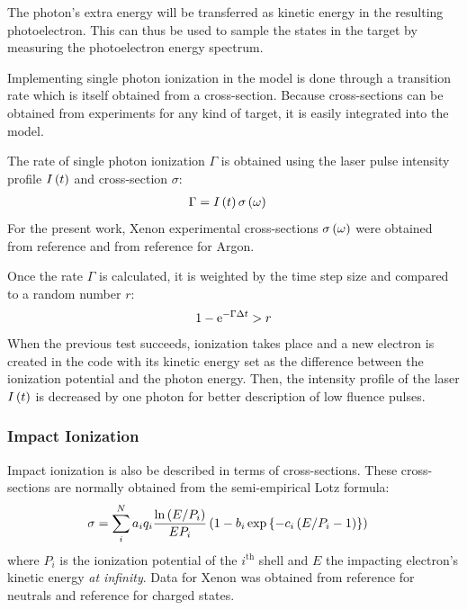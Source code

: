 The photon's extra energy will be transferred as kinetic energy in the
resulting photoelectron. This can thus be used to sample the states in the
target by measuring the photoelectron energy spectrum\cite{Fennel2010}.

Implementing single photon ionization in the model is done through a
transition rate which is itself obtained from a cross-section. Because
cross-sections can be obtained from experiments for any kind of target, it is
easily integrated into the model.

The rate of single photon ionization $\Gamma$ is obtained using the laser
pulse intensity profile $I\left( t \right)$ and cross-section $\sigma$:
\begin{align}
\Gamma & = I\left( t \right) \sigma\left( \omega \right)
\end{align}
For the present work, Xenon experimental cross-sections $\sigma\left( \omega \right)$
were obtained from reference \cite{West1978} and from reference
\cite{Marr1976} for Argon.

Once the rate $\Gamma$ is calculated, it is weighted\cite{Lax2006} by the time
step size and compared to a random number $r$:
\begin{align}
1 - \textrm{e}^{-\Gamma \Delta t} > r
\end{align}
When the previous test succeeds, ionization takes place and a new electron is
created in the code with its kinetic energy set as the difference between the
ionization potential and the photon energy. Then, the intensity profile of the
laser $I\left( t \right)$ is decreased by one photon for better description of low fluence
pulses.





\subsubsection{Impact Ionization}
Impact ionization is also be described in terms of cross-sections. These
cross-sections are normally obtained from the semi-empirical Lotz
formula\cite{Lotz1967}:
\begin{align}
\sigma & = \sum_{i}^{N} a_i q_i \frac{\ln{\left( E/P_i \right)}}{E P_i} \left( 1 - b_i
\exp{ \left\{ -c_i \left( E/P_i - 1 \right) \right\}} \right)
\label{eqn:impact:ionization:lotz}
\end{align}
where $P_i$ is the ionization potential of the $i^{\textrm{th}}$ shell and $E$
the impacting electron's kinetic energy \textit{at infinity}.
Data for Xenon was obtained from reference \cite{Tawara1987} for neutrals
and reference \cite{Heidenreich2005} for charged states.

